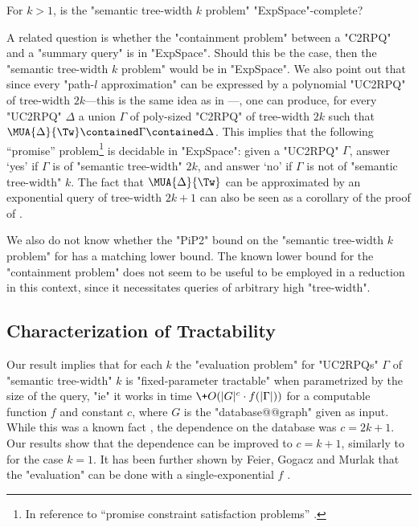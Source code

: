 \begin{question}
    For $k > 1$, is the "semantic tree-width $k$ problem" "ExpSpace"-complete?
\end{question}
A related question is whether the "containment problem" between a "C2RPQ" and a "summary query" is in "ExpSpace". Should this be the case, then the "semantic tree-width $k$ problem" would be in "ExpSpace".
We also point out that since every "path-$l$ approximation" can be expressed by a polynomial "UC2RPQ" of tree-width $2k$---this is the same idea as in \cite[Lemma IV.13]{RomeroBarceloVardi2017Homomorphism}---, one can produce, for every "UC2RPQ" $\Delta$ a union $\Gamma$ of poly-sized "C2RPQ" of tree-width $2k$ such that $ \MUA{\Delta}{\Tw} \contained \Gamma \contained \Delta$. This implies that the following ``promise'' problem\footnote{In reference to ``promise constraint satisfaction problems''
\cite[Definition 2.3]{BrakensiekGuruswami2021PCSP}.} is decidable in "ExpSpace": given a "UC2RPQ" $\Gamma$, answer `yes' if $\Gamma$ is of "semantic tree-width" $2k$, and answer `no' if $\Gamma$ is not of "semantic tree-width" $k$. The fact that $\MUA{\Delta}{\Tw}$ can be approximated by an exponential query of tree-width $2k+1$ can also be seen as a corollary of the proof of \cite[Theorem~V.1]{RomeroBarceloVardi2017Homomorphism}.

We also do not know whether the {"PiP2"} bound on the "semantic tree-width $k$ problem" for {\UCRPQSRE} has a matching lower bound. The known lower bound for the {\UCRPQSRE} "containment problem" \cite[Theorem~5.1]{FigueiraEtal2020Containment} does not seem to be useful to be employed in a reduction in this context, since it necessitates queries of arbitrary high "tree-width".

\subsection{\AP{}Characterization of Tractability}
\label{sec:charact-tractability}

Our result implies that for each $k$
the "evaluation problem" for "UC2RPQs" $\Gamma$
of "semantic tree-width" $k$ is "fixed-parameter tractable" when parametrized
by the size of the query, "ie" it works in time $\+O(|G|^{c} \cdot f(|\Gamma|))$
for a computable function $f$ and constant $c$, where $G$ is the "database@@graph" given as input.
%
While this was a known fact \cite[Corollary IV.12]{RomeroBarceloVardi2017Homomorphism}, the dependence on the database was $c=2k+1$.  Our results show that the dependence can be improved to $c=k+1$, similarly to \cite[Theorem 6.3]{BarceloRomeroVardi2016SemanticAcyclicity} for the case $k=1$.
It has been further shown by Feier, Gogacz and Murlak that the "evaluation" can be done with a single-exponential $f$ \cite[Theorem~22]{FeierGogaczMurlak24Treewidth}.

